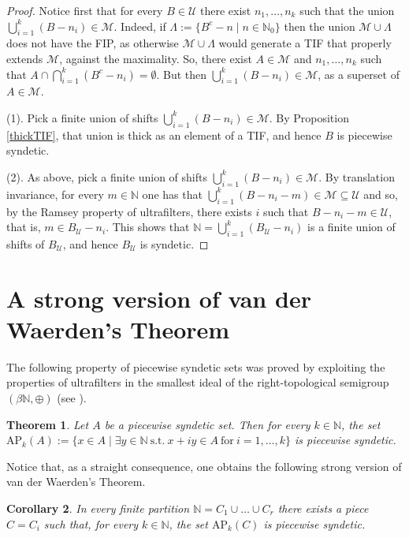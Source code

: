 \documentclass[10pt]{amsart}
\newtheorem{theorem}{Theorem}[section]
\newtheorem{corollary}[theorem]{Corollary}
\theoremstyle{definition}
\theoremstyle{remark}
\def\N{\mathbb{N}}
\def\U{\mathcal{U}}
\begin{document}
\begin{proof}
Notice first that for every $B\in\U$ there exist $n_1,\ldots,n_k$ such that 
the union $\bigcup_{i=1}^k(B-n_i)\in\mathcal{M}$. Indeed, if
$\Lambda:=\{B^c-n\mid n\in\N_0\}$ then the union $\mathcal{M}\cup\Lambda$
does not have the FIP, as otherwise $\mathcal{M}\cup\Lambda$ would generate
a TIF that properly extends $\mathcal{M}$, against the maximality. 
So, there exist $A\in\mathcal{M}$ and
$n_1,\ldots,n_k$ such that $A\cap\bigcap_{i=1}^k(B^c-n_i)=\emptyset$.
But then $\bigcup_{i=1}^k(B-n_i)\in\mathcal{M}$, as a superset of $A\in\mathcal{M}$.

(1). Pick a finite union of shifts 
$\bigcup_{i=1}^k(B-n_i)\in\mathcal{M}$. By Proposition \ref{thickTIF},
that union is thick as an element of a TIF, and hence $B$ is piecewise syndetic.

(2). As above, pick a finite union of shifts 
$\bigcup_{i=1}^k(B-n_i)\in\mathcal{M}$.
By translation invariance, for every $m\in\N$ one has that
$\bigcup_{i=1}^k(B-n_i-m)\in\mathcal{M}\subseteq\U$
and so, by the Ramsey property of ultrafilters, there exists $i$ such that
$B-n_i-m\in\U$, that is, $m\in B_\U-n_i$.
This shows that $\N=\bigcup_{i=1}^k(B_\U-n_i)$ is a finite union of shifts of $B_\U$,
and hence $B_\U$ is syndetic.
\end{proof}


\section{A strong version of van der Waerden's Theorem}

The following property of piecewise syndetic sets 
was proved by exploiting the properties
of ultrafilters in the smallest ideal of the
right-topological semigroup $(\beta\N,\oplus)$
(see \cite{fg,bh}).

\begin{theorem}\label{main}
Let $A$ be a piecewise syndetic set. Then for every $k\in\N$, the set 
$\text{AP}_k(A):=
\{x\in A\mid \exists y\in\N\ \text{s.t.}\ x+i y\in A\ \text{for}\ i=1,\ldots,k\}$
is piecewise syndetic.
\end{theorem}

Notice that, as a straight consequence, one obtains the following strong version
of van der Waerden's Theorem.

\begin{corollary}
In every finite partition $\N=C_1\cup\ldots\cup C_r$
there exists a piece $C=C_i$ such that,
for every $k\in\N$, the set 
$\text{AP}_k(C)$ is piecewise syndetic.
\end{corollary}
\end{document}
